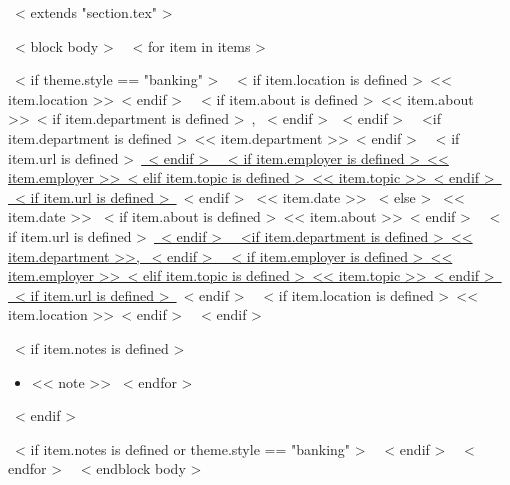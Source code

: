~< extends "section.tex" >~

~< block body >~
  ~< for item in items >~
    \begin{samepage}
      \cventry
        ~< if theme.style == "banking" >~
          {~< if item.location is defined >~<< item.location >>~< endif >~}
          {~< if item.about is defined >~<< item.about >>~< if item.department is defined >~, ~< endif >~~< endif >~%
             ~<if item.department is defined >~<< item.department >>~< endif >~}
          {~< if item.url is defined >~\href{<< item.url >>}{~< endif >~%
             ~< if item.employer is defined >~<< item.employer >>~< elif item.topic is defined >~<< item.topic >>~< endif >~%
           ~< if item.url is defined >~}~< endif >~}
          {<< item.date >>}
        ~< else >~
          {<< item.date >>}
          {~< if item.about is defined >~<< item.about >>~< endif >~}
          {~< if item.url is defined >~\href{<< item.url >>}{~< endif >~%
             ~<if item.department is defined >~<< item.department >>, ~< endif >~
             ~< if item.employer is defined >~<< item.employer >>~< elif item.topic is defined >~<< item.topic >>~< endif >~%
           ~< if item.url is defined >~}~< endif >~}
          {~< if item.location is defined >~<< item.location >>~< endif >~}
        ~< endif >~
        {}
        {
          ~< if item.notes is defined >~
            \begin{itemize}
              ~< for note in item.notes >~
                \item{<< note >>}
              ~< endfor >~
            \end{itemize}
          ~< endif >~
        }
    \end{samepage}
    ~< if item.notes is defined or theme.style == "banking" >~
    ~< endif >~
  ~< endfor >~
~< endblock body >~